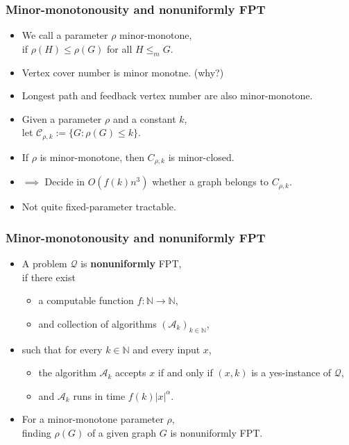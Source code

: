\documentclass[t,usenames,dvipsnames]{beamer}
\begin{document}
\begin{frame} \frametitle{Minor-monotonousity and nonuniformly FPT}
	\begin{itemize}[<+->]
		\item We call a parameter $\rho$ minor-monotone,\\
			\hspace{1cm}if $\rho(H)\leq \rho(G)$ for all $H \leq_m G$.
		\item Vertex cover number is minor monotne. (why?)
		\item Longest path and feedback vertex number are also minor-monotone.
		\item Given a parameter $\rho$ and a constant $k$,\\
		\hspace{1cm}let $\mathcal{C}_{\rho, k} := \{G \colon \rho(G) \leq k\}$.
		\item If $\rho$ is minor-monotone, then $C_{\rho, k}$ is minor-closed.
		\item[] $\implies$ Decide in $O(f(k) n^3)$ whether a graph belongs to $C_{\rho, k}$.
		\item Not quite fixed-parameter tractable.
	\end{itemize}
\end{frame}
\begin{frame} \frametitle{Minor-monotonousity and nonuniformly FPT}
	\begin{itemize}[<+->]
		\item A problem $\mathcal{Q}$ is \textbf{nonuniformly} FPT,\\
			\hspace{1cm}if there exist
			\begin{itemize}
				\item a computable function $f:\mathbb{N}\rightarrow\mathbb{N}$,
				\item and collection of algorithms $(\mathcal{A}_k)_{k \in
					\mathbb{N}}$,
			\end{itemize}
		\item[] such that for every $k \in \mathbb{N}$ and every input $x$, 
		\begin{itemize}[<+->]
			\item the algorithm $\mathcal{A}_k$ accepts $x$ if and only if $(x,
				k)$ is a yes-instance of $\mathcal{Q}$,
			\item and $\mathcal{A}_k$ runs in time $f(k)|x|^{\alpha}$.
		\end{itemize}
	\item For a minor-monotone parameter $\rho$,\\
		\hspace{1cm}finding $\rho(G)$ of a given graph $G$ is nonuniformly FPT.
	\end{itemize}
	
\end{frame}
\end{document}
